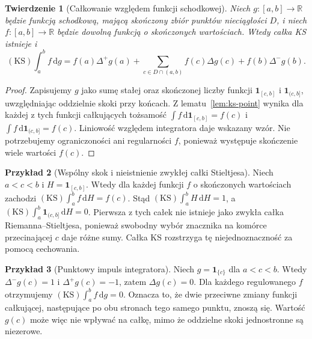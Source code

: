 \documentclass[11pt,a4paper]{article}
\numberwithin{equation}{section}
\theoremstyle{plain}
\newtheorem{twierdzenie}{Twierdzenie}[section]
\theoremstyle{definition}
\newtheorem{przyklad}[twierdzenie]{Przykład}
\theoremstyle{remark}
\newcommand{\R}{\mathbb R}
\newcommand{\ind}[1]{\mathbf 1_{#1}}
\newcommand{\KS}{\mathrm{KS}}
\begin{document}
\begin{twierdzenie}[Całkowanie względem funkcji schodkowej]
\label{tw:ks-step}
Niech $g:[a,b]\to\R$ będzie funkcją schodkową, mającą skończony zbiór punktów nieciągłości $D$, i niech $f:[a,b]\to\R$ będzie dowolną funkcją o skończonych wartościach. Wtedy całka KS istnieje i
\[
 (\KS)\int_a^b f\,\mathrm dg
 =f(a)\Delta^+g(a)+\sum_{c\in D\cap(a,b)}f(c)\Delta g(c)+f(b)\Delta^-g(b).
\]
\end{twierdzenie}
\begin{proof}
Zapisujemy $g$ jako sumę stałej oraz skończonej liczby funkcji $\ind{[c,b]}$ i $\ind{(c,b]}$, uwzględniając oddzielnie skoki przy końcach. Z lematu~\ref{lem:ks-point} wynika dla każdej z tych funkcji całkujących tożsamość $\int f\,\mathrm d\ind{[c,b]}=f(c)$ i $\int f\,\mathrm d\ind{(c,b]}=f(c)$. Liniowość względem integratora daje wskazany wzór. Nie potrzebujemy ograniczoności ani regularności $f$, ponieważ występuje skończenie wiele wartości $f(c)$.
\end{proof}

\begin{przyklad}[Wspólny skok i nieistnienie zwykłej całki Stieltjesa]
Niech $a<c<b$ i $H=\ind{[c,b]}$. Wtedy dla każdej funkcji $f$ o skończonych wartościach zachodzi $(\KS)\int_a^b f\,\mathrm dH=f(c)$. Stąd $(\KS)\int_a^b H\,\mathrm dH=1$, a $(\KS)\int_a^b\ind{(c,b]}\,\mathrm dH=0$. Pierwsza z tych całek nie istnieje jako zwykła całka Riemanna--Stieltjesa, ponieważ swobodny wybór znacznika na komórce przecinającej $c$ daje różne sumy. Całka KS rozstrzyga tę niejednoznaczność za pomocą cechowania.
\end{przyklad}

\begin{przyklad}[Punktowy impuls integratora]
Niech $g=\ind{\{c\}}$ dla $a<c<b$. Wtedy $\Delta^-g(c)=1$ i $\Delta^+g(c)=-1$, zatem $\Delta g(c)=0$. Dla każdego regulowanego $f$ otrzymujemy $(\KS)\int_a^b f\,\mathrm dg=0$. Oznacza to, że dwie przeciwne zmiany funkcji całkującej, następujące po obu stronach tego samego punktu, znoszą się. Wartość $g(c)$ może więc nie wpływać na całkę, mimo że oddzielne skoki jednostronne są niezerowe.
\end{przyklad}
\end{document}
